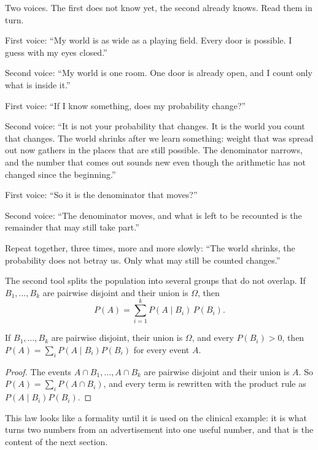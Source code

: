 \begin{bacakeras}
Two voices. The first does not know yet, the second already knows. Read them in turn.

First voice: ``My world is as wide as a playing field. Every door is possible. I guess with
my eyes closed.''

Second voice: ``My world is one room. One door is already open, and I count only what is
inside it.''

First voice: ``If I know something, does my probability change?''

Second voice: ``It is not your probability that changes. It is the world you count that
changes. The world shrinks after we learn something: weight that was spread out now
gathers in the places that are still possible. The denominator narrows, and the number that
comes out sounds new even though the arithmetic has not changed since the beginning.''

First voice: ``So it is the denominator that moves?''

Second voice: ``The denominator moves, and what is left to be recounted is the remainder
that may still take part.''

Repeat together, three times, more and more slowly: ``The world shrinks, the probability
does not betray us. Only what may still be counted changes.''
\end{bacakeras}

The second tool splits the population into several groups that do not overlap. If
$B_{1},\dots,B_{k}$ are pairwise disjoint and their union is $\Omega$, then
\[
P(A)=\sum_{i=1}^{k}P(A\mid B_{i})\,P(B_{i}).
\]

\begin{proposisi}
If $B_{1},\dots,B_{k}$ are pairwise disjoint, their union is $\Omega$, and every
$P(B_{i})>0$, then $P(A)=\sum_{i}P(A\mid B_{i})P(B_{i})$ for every event $A$.
\end{proposisi}

\begin{proof}
The events $A\cap B_{1},\dots,A\cap B_{k}$ are pairwise disjoint and their union is $A$.
So $P(A)=\sum_{i}P(A\cap B_{i})$, and every term is rewritten with the product rule as
$P(A\mid B_{i})P(B_{i})$.
\end{proof}

This law looks like a formality until it is used on the clinical example: it is what turns
two numbers from an advertisement into one useful number, and that is the content of the
next section.

